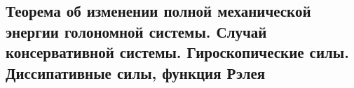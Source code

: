 

\subsection{Теорема об изменении полной механической энергии голономной системы. Случай консервативной системы. Гироскопические силы. Диссипативные силы, функция Рэлея}



